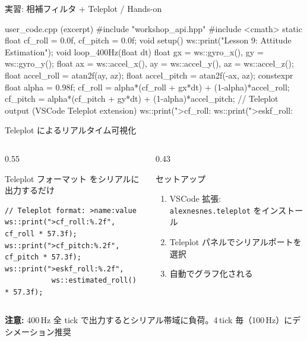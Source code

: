 \begin{frame}[fragile]{実習: 相補フィルタ + Teleplot / Hands-on}
  \vspace{-0.5em}
  \begin{sflisting}[basicstyle=\ttfamily\scriptsize]{user\_code.cpp (excerpt)}
#include "workshop_api.hpp"
#include <cmath>
static float cf_roll = 0.0f, cf_pitch = 0.0f;
void setup() { ws::print("Lesson 9: Attitude Estimation"); }
void loop_400Hz(float dt) {
    float gx = ws::gyro_x(), gy = ws::gyro_y();
    float ax = ws::accel_x(), ay = ws::accel_y(),
          az = ws::accel_z();
    float accel_roll  = atan2f(ay, az);
    float accel_pitch = atan2f(-ax, az);
    constexpr float alpha = 0.98f;
    cf_roll  = alpha*(cf_roll + gx*dt) + (1-alpha)*accel_roll;
    cf_pitch = alpha*(cf_pitch + gy*dt) + (1-alpha)*accel_pitch;
    // Teleplot output (VSCode Teleplot extension)
    ws::print(">cf_roll:%
    ws::print(">eskf_roll:%
}
  \end{sflisting}
\end{frame}

\begin{frame}[fragile]{Teleplot によるリアルタイム可視化}
  \begin{columns}[c]
    \begin{column}{0.55\textwidth}
      \begin{block}{Teleplot フォーマット}
         をシリアルに出力するだけ
      \end{block}
      \begin{lstlisting}[style=sfcpp, basicstyle=\ttfamily\scriptsize]
// Teleplot format: >name:value
ws::print(">cf_roll:%.2f", cf_roll * 57.3f);
ws::print(">cf_pitch:%.2f", cf_pitch * 57.3f);
ws::print(">eskf_roll:%.2f",
           ws::estimated_roll() * 57.3f);
      \end{lstlisting}
    \end{column}
    \begin{column}{0.43\textwidth}
      \begin{exampleblock}{セットアップ}
        \begin{enumerate}
          \item VSCode 拡張: \texttt{alexnesnes.teleplot} をインストール
          \item Teleplot パネルでシリアルポートを選択
          \item 自動でグラフ化される
        \end{enumerate}
      \end{exampleblock}
    \end{column}
  \end{columns}

  \vspace{0.5em}
  {\footnotesize \textbf{注意:} 400\,Hz 全 tick で出力するとシリアル帯域に負荷。4\,tick 毎（100\,Hz）にデシメーション推奨}
\end{frame}

